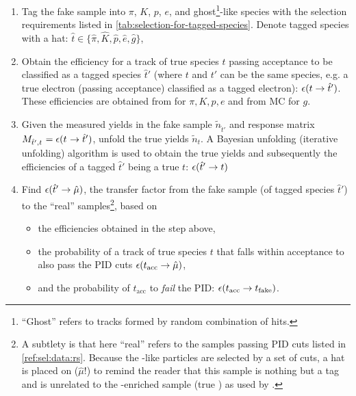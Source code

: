 \begin{enumerate}
    \item Tag the fake \muon sample into $\pi$, $K$, $p$,
        $e$, and ghost\footnote{
            ``Ghost'' refers to tracks formed by random combination of hits.
        }-like species with the selection requirements listed in
        \cref{tab:selection-for-tagged-species}.
        Denote tagged species with a hat:
        $\hat{t} \in \{\hat{\pi}, \hat{K}, \hat{p}, \hat{e}, \hat{g}\}$,

    \item Obtain the efficiency for a track of true species $t$ passing \muon
        acceptance to be classified as a tagged species $\hat{t}'$
        (where $t$ and $t'$ can be the same species, e.g. a true electron
        (passing \muon acceptance) classified as a tagged electron):
        $\misEff[t]{\hat{t}'}$.
        These efficiencies are obtained from \pidcalib for $\pi, K, p, e$ and
        from MC for $g$.

    \item Given the measured yields in the fake \muon sample $\tilde{n}_{\hat{t}'}
        $ and response matrix
        $M_{\hat{t}', t^{\phantom{}}} = \misEff[t^{\phantom{}}]{\hat{t}'}$,
        unfold the true yields $\tilde{n}_{t}$.
        A Bayesian unfolding (iterative unfolding) algorithm is used to obtain
        the true yields  %
        and subsequently the efficiencies of a tagged
        $\hat{t}'$ being a true $t$: $\misEff[\hat{t}']{t}$

      \item Find $\misEff[\hat{t}']{\hat{\mu}}$,
        the transfer factor from the fake \muon sample
        (of tagged species $\hat{t}'$) to the ``real'' \muon
        samples\footnote{
            A subtlety is that here ``real'' \muon refers to the samples passing
            \muon PID cuts listed in \cref{ref:sel:data:rs}.
            Because the \muon-like particles are selected by a set of cuts,
            a hat is placed on \muon ($\hat{\mu}$!)
            to remind the reader that this sample is nothing but a \muon tag
            and is unrelated to the \muon-enriched sample (true \muon) as used
            by \pidcalib.
        },
        based on
        \begin{itemize}
            \item the efficiencies obtained in the step above,
            \item the probability of a track of true species $t$ that falls
                within \muon acceptance to also pass the \muon PID cuts
                $\misEff[t_\text{acc}]{\hat{\mu}}$,
            \item and the probability of $t_\text{acc}$ to \emph{fail} the \muon
                PID:
                $\misEff[t_\text{acc}]{t_\text{fake}}$.
        \end{itemize}


\end{enumerate}

